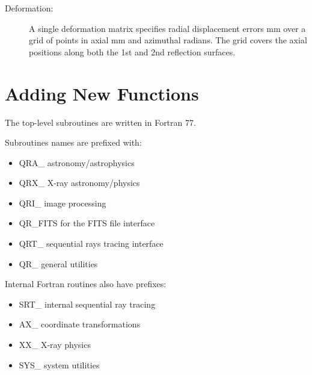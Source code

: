 \documentclass[letterpaper,10pt,english]{sphinxmanual}
\begin{document}
\begin{fulllineitems}
\begin{quote}
\begin{description}
\begin{itemize}
\end{itemize}

\end{description}\end{quote}
\begin{description}
\item[{Deformation:}] \leavevmode
A single deformation matrix specifies radial displacement errors mm
over a grid of points in  axial mm and azimuthal radians.
The grid covers the axial positions along both the 1st and 2nd
reflection surfaces.

\end{description}

\end{fulllineitems}



\chapter{Adding New Functions}
\label{\detokenize{qsoft_modifying:adding-new-functions}}\label{\detokenize{qsoft_modifying::doc}}
The top-level subroutines are written in Fortran 77.

Subroutines names are prefixed with:
\begin{itemize}
\item {} 
QRA\_ astronomy/astrophysics

\item {} 
QRX\_ X-ray astronomy/physics

\item {} 
QRI\_ image processing

\item {} 
QR\_FITS for the FITS file interface

\item {} 
QRT\_ sequential rays tracing interface

\item {} 
QR\_ general utilities

\end{itemize}

Internal Fortran routines also have prefixes:
\begin{itemize}
\item {} 
SRT\_ internal sequential ray tracing

\item {} 
AX\_ coordinate transformations

\item {} 
XX\_ X-ray physics

\item {} 
SYS\_ system utilities

\end{itemize}
\end{document}
